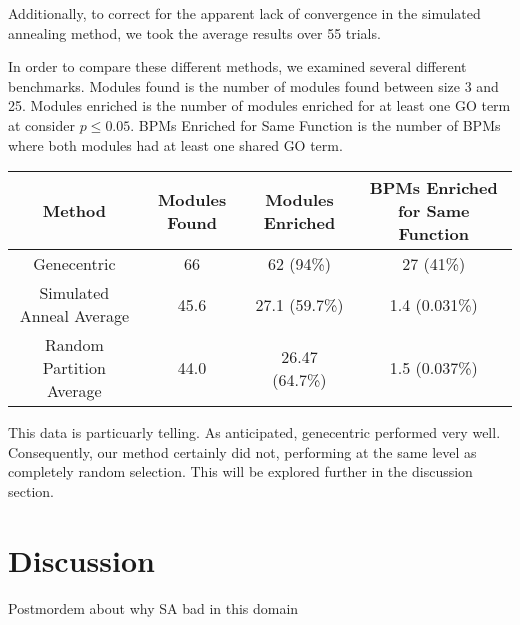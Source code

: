 \documentclass[11pt]{article}
\begin{document}
\par Additionally, to correct for the apparent lack of convergence in the simulated annealing method, we took the average results over 55 trials.

\par In order to compare these different methods, we examined several different benchmarks. Modules found is the number of modules found between size 3 and 25. Modules enriched is the number of modules enriched for at least one GO term at consider  $p \leq 0.05 $. BPMs Enriched for Same Function is the number of BPMs where both modules had at least one shared GO term.
\begin{center}
\begin{tabular}{ |c | c |c| c | } 
 \hline
 Method & Modules Found & Modules Enriched & BPMs Enriched for Same Function \\
	\hline
 Genecentric              & 66 & 62 (94\%) & 27 (41\%)\\ 
	\hline 
 Simulated Anneal Average & 45.6 & 27.1 (59.7\%) & 1.4 (0.031\%)\\ 
 \hline
 Random Partition Average & 44.0 & 26.47 (64.7\%) & 1.5 (0.037\%)\\ 
 \hline
\end{tabular}
\end{center}
\par This data is particuarly telling. As anticipated, genecentric performed very well. Consequently, our method certainly did not, performing at the same level as completely random selection. This will be explored further in the discussion section.



\section{Discussion}
Postmordem about why SA bad in this domain
\end{document}
